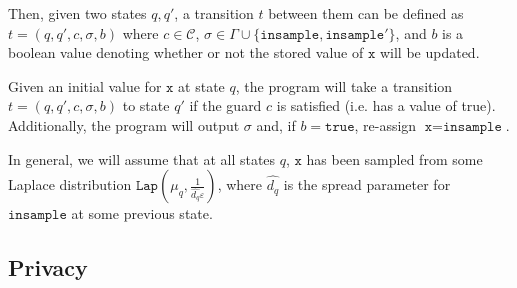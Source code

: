 \documentclass[12pt]{article}
\newcommand{\Lap}{\texttt{Lap}}
\theoremstyle{definition}
\begin{document}
Then, given two states $q, q'$, a transition $t$ between them can be defined as $t = (q, q', c, \sigma, b)$ where $c\in \mathcal{C}$, $\sigma\in \Gamma\cup\{\texttt{insample}, \texttt{insample}'\}$, and $b$ is a boolean value denoting whether or not the stored value of $\texttt{x}$ will be updated. 

Given an initial value for $\texttt{x}$ at state $q$, the program will take a transition $t=(q, q', c, \sigma, b)$ to state $q'$ if the guard $c$ is satisfied (i.e. has a value of true). Additionally, the program will output $\sigma$ and, if $b=\texttt{true}$, re-assign $\texttt{x}=\texttt{insample}$. 

In general, we will assume that at all states $q$, $\texttt{x}$ has been sampled from some Laplace distribution $\Lap(\mu_q, \frac{1}{\hat{d_{q}}\varepsilon})$, where $\hat{d_{q}}$ is the spread parameter for $\texttt{insample}$ at some previous state. 

\subsection{Privacy}
\end{document}
